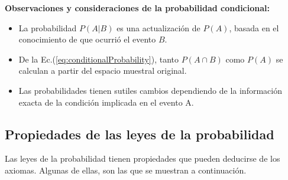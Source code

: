 \def\firsttcircle{(90:1.75cm) circle (1.5cm)}
\def\seconddcircle{(170:1.75cm) circle (1.5cm)}
\def\thirddcircle{(-25:2cm) circle (1.5cm)}
\begin{figure}
    \centering
{}
\end{figure}

\textbf{Observaciones y consideraciones de la probabilidad condicional:}

\begin{itemize}
\item La probabilidad $P(A|B)$ es una actualización de $P(A)$, basada en el
conocimiento de que ocurrió el evento $B$.

\item De la Ec.(\ref{eq:conditionalProbability}), tanto $P(A \cap B)$ como
$P(A)$ se calculan a partir del espacio muestral original.

\item Las probabilidades tienen sutiles cambios dependiendo de la información
exacta de la condición implicada en el evento A.
\end{itemize}

\subsection{Propiedades de las leyes de la probabilidad}

Las leyes de la probabilidad tienen propiedades que pueden deducirse de los
axiomas. Algunas de ellas, son las que se muestran a continuación.

